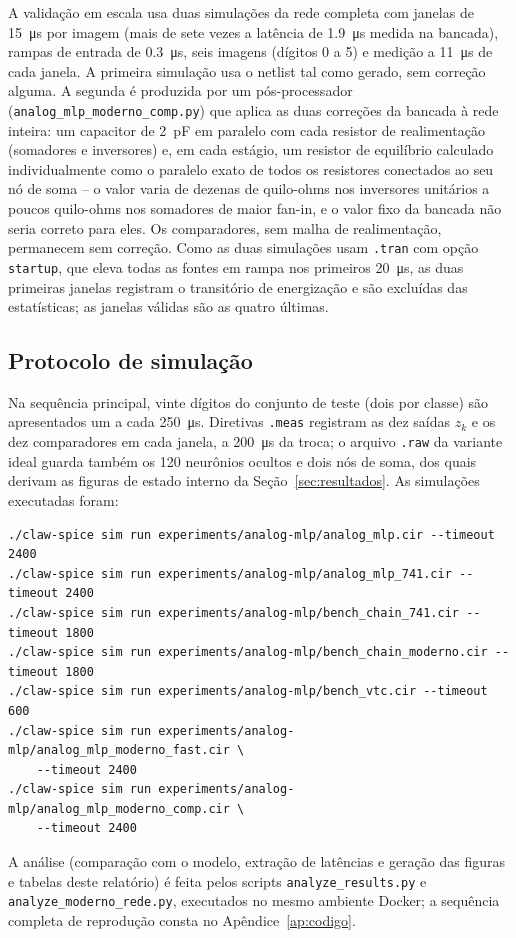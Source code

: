 A validação em escala usa duas simulações da rede completa com janelas
de \SI{15}{\micro\second} por imagem (mais de sete vezes a latência de
\SI{1,9}{\micro\second} medida na bancada), rampas de entrada de
\SI{0,3}{\micro\second}, seis imagens (dígitos 0 a 5) e medição a
\SI{11}{\micro\second} de cada janela. A primeira simulação usa o
netlist tal como gerado, sem correção alguma. A segunda é produzida
por um pós-processador (\texttt{analog\_mlp\_moderno\_comp.py}) que
aplica as duas correções da bancada à rede inteira: um capacitor de
\SI{2}{\pico\farad} em paralelo com cada resistor de realimentação
(somadores e inversores) e, em cada estágio, um resistor de equilíbrio
calculado individualmente como o paralelo exato de todos os resistores
conectados ao seu nó de soma -- o valor varia de dezenas de
quilo-ohms nos inversores unitários a poucos quilo-ohms nos somadores
de maior fan-in, e o valor fixo da bancada não seria correto para
eles. Os comparadores, sem malha de realimentação, permanecem sem
correção. Como as duas simulações usam \texttt{.tran} com opção
\texttt{startup}, que eleva todas as fontes em rampa nos primeiros
\SI{20}{\micro\second}, as duas primeiras janelas registram o
transitório de energização e são excluídas das estatísticas; as
janelas válidas são as quatro últimas.

\subsection{Protocolo de simulação}
\label{sec:protocolo}

Na sequência principal, vinte dígitos do conjunto de teste (dois por
classe) são apresentados um a cada \SI{250}{\micro\second}. Diretivas
\texttt{.meas} registram as dez saídas $z_k$ e os dez comparadores em
cada janela, a \SI{200}{\micro\second} da troca; o arquivo
\texttt{.raw} da variante ideal guarda também os 120 neurônios
ocultos e dois nós de soma, dos quais derivam as figuras de estado
interno da Seção~\ref{sec:resultados}. As simulações executadas foram:

\begin{verbatim}
./claw-spice sim run experiments/analog-mlp/analog_mlp.cir --timeout 2400
./claw-spice sim run experiments/analog-mlp/analog_mlp_741.cir --timeout 2400
./claw-spice sim run experiments/analog-mlp/bench_chain_741.cir --timeout 1800
./claw-spice sim run experiments/analog-mlp/bench_chain_moderno.cir --timeout 1800
./claw-spice sim run experiments/analog-mlp/bench_vtc.cir --timeout 600
./claw-spice sim run experiments/analog-mlp/analog_mlp_moderno_fast.cir \
    --timeout 2400
./claw-spice sim run experiments/analog-mlp/analog_mlp_moderno_comp.cir \
    --timeout 2400
\end{verbatim}

A análise (comparação com o modelo, extração de latências e geração
das figuras e tabelas deste relatório) é feita pelos scripts
\texttt{analyze\_results.py} e \texttt{analyze\_moderno\_rede.py},
executados no mesmo ambiente Docker; a sequência completa de
reprodução consta no Apêndice~\ref{ap:codigo}.
